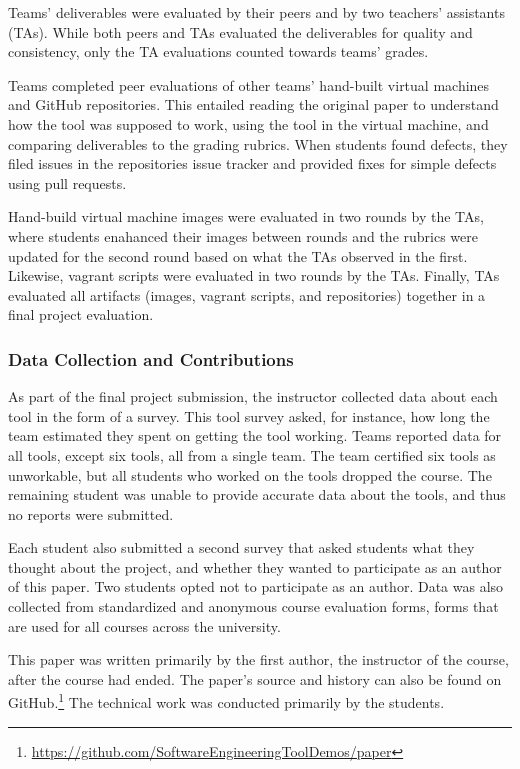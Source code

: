 \documentclass{sig-alternate-05-2015}
\begin{document}
Teams' deliverables were evaluated by their 
peers and by two teachers' assistants (TAs).
While both peers and TAs evaluated the deliverables
for quality and consistency, only the TA evaluations
counted towards teams' grades.

Teams completed peer evaluations of other teams' hand-built 
virtual machines and GitHub repositories.
This entailed reading the original paper to understand
how the tool was supposed to work, 
using the tool in the virtual machine,
and comparing deliverables to the grading rubrics.
When students found defects, they filed issues 
in the repositories issue tracker and provided
fixes for simple defects using pull requests.


Hand-build virtual machine images were evaluated in 
two rounds by the TAs, where students enahanced their
images between rounds and the rubrics were updated
for the second round based on what the TAs 
observed in the first.
Likewise, vagrant scripts were evaluated in two rounds
by the TAs.
Finally, TAs evaluated all artifacts (images, vagrant 
scripts, and repositories) together in a final project 
evaluation.

\subsubsection{Data Collection and Contributions}

As part of the final project submission, 
the instructor collected data about 
each tool in the form of a survey.
This tool survey asked, for instance, how long
the team estimated they spent on getting 
the tool working.
Teams reported data for all tools, except six tools,
all from a single team.
The team certified six tools as unworkable,
but all students who worked on the tools dropped
the course.
The remaining student was unable 
to provide accurate data about the tools, and thus 
no reports were submitted.

Each student also submitted a second survey that
asked students what they thought about the project,
and whether they wanted to participate as an
author of this paper.
Two students opted not to participate as an author.
Data was also collected from standardized and 
anonymous course evaluation forms, forms
that are used for all courses 
across the university.

This paper was written primarily by the first author,
the instructor of the course, after the course 
had ended.
The paper's source and history can also be found 
on GitHub.\footnote{\url{https://github.com/SoftwareEngineeringToolDemos/paper}}
The technical work was conducted primarily by the students.
\end{document}
